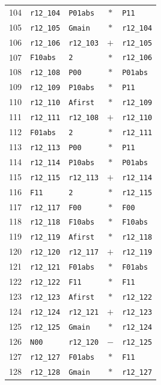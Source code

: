 \begin{longtable}{rllcl}
104 & \texttt{r12\_104} & \texttt{P01abs} & $*$ & \texttt{P11}\\
105 & \texttt{r12\_105} & \texttt{Gmain} & $*$ & \texttt{r12\_104}\\
106 & \texttt{r12\_106} & \texttt{r12\_103} & $+$ & \texttt{r12\_105}\\
107 & \texttt{F10abs} & \texttt{2} & $*$ & \texttt{r12\_106}\\
108 & \texttt{r12\_108} & \texttt{P00} & $*$ & \texttt{P01abs}\\
109 & \texttt{r12\_109} & \texttt{P10abs} & $*$ & \texttt{P11}\\
110 & \texttt{r12\_110} & \texttt{Afirst} & $*$ & \texttt{r12\_109}\\
111 & \texttt{r12\_111} & \texttt{r12\_108} & $+$ & \texttt{r12\_110}\\
112 & \texttt{F01abs} & \texttt{2} & $*$ & \texttt{r12\_111}\\
113 & \texttt{r12\_113} & \texttt{P00} & $*$ & \texttt{P11}\\
114 & \texttt{r12\_114} & \texttt{P10abs} & $*$ & \texttt{P01abs}\\
115 & \texttt{r12\_115} & \texttt{r12\_113} & $+$ & \texttt{r12\_114}\\
116 & \texttt{F11} & \texttt{2} & $*$ & \texttt{r12\_115}\\
117 & \texttt{r12\_117} & \texttt{F00} & $*$ & \texttt{F00}\\
118 & \texttt{r12\_118} & \texttt{F10abs} & $*$ & \texttt{F10abs}\\
119 & \texttt{r12\_119} & \texttt{Afirst} & $*$ & \texttt{r12\_118}\\
120 & \texttt{r12\_120} & \texttt{r12\_117} & $+$ & \texttt{r12\_119}\\
121 & \texttt{r12\_121} & \texttt{F01abs} & $*$ & \texttt{F01abs}\\
122 & \texttt{r12\_122} & \texttt{F11} & $*$ & \texttt{F11}\\
123 & \texttt{r12\_123} & \texttt{Afirst} & $*$ & \texttt{r12\_122}\\
124 & \texttt{r12\_124} & \texttt{r12\_121} & $+$ & \texttt{r12\_123}\\
125 & \texttt{r12\_125} & \texttt{Gmain} & $*$ & \texttt{r12\_124}\\
126 & \texttt{N00} & \texttt{r12\_120} & $-$ & \texttt{r12\_125}\\
127 & \texttt{r12\_127} & \texttt{F01abs} & $*$ & \texttt{F11}\\
128 & \texttt{r12\_128} & \texttt{Gmain} & $*$ & \texttt{r12\_127}\\

\end{longtable}
